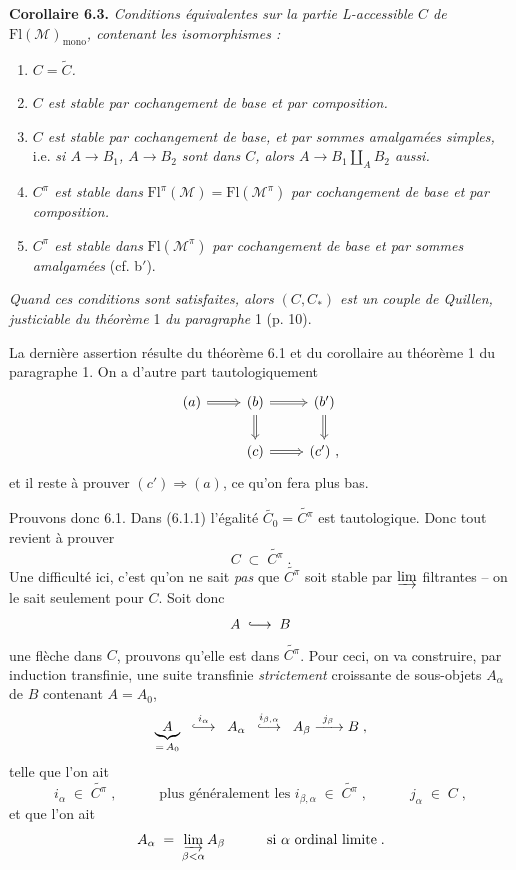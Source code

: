 \documentclass[11pt]{article}
\newcommand{\printedpage}[1]{\marginpar{\footnotesize p.~#1}}
\newcommand{\msp}[1]{\marginpar{\footnotesize [#1]}}
\newcommand{\Fl}{\mathrm{Fl}}
\newcommand{\into}{\lhook\joinrel\longrightarrow}
\begin{document}
\textbf{Corollaire 6.3.} \textit{Conditions équivalentes sur la partie L-accessible $C$ de} $\Fl(\mathcal{M})_{\mathrm{mono}}$\textit{, contenant les isomorphismes :}
\begin{enumerate}[label={}]
\item[a)] \textit{$C = \widetilde{C}$.}
\item[b)] \textit{$C$ est stable par cochangement de base et par composition.}
\item[b$'$)] \textit{$C$ est stable par cochangement de base, et par sommes amalgamées simples,} i.e. \textit{si $A \longrightarrow B_{1}$, $A \longrightarrow B_{2}$ sont dans $C$, alors $A \longrightarrow B_{1} \amalg_{A} B_{2}$ aussi.}
\item[c)] \textit{$C^{\pi}$ est stable dans} $\Fl^{\pi}(\mathcal{M}) = \Fl(\mathcal{M}^{\pi})$ \textit{par cochangement de base et par composition.}
\item[c$'$)] \textit{$C^{\pi}$ est stable dans} $\Fl(\mathcal{M}^{\pi})$ \textit{par cochangement de base et par sommes amalgamées} (cf. b$'$).
\end{enumerate}
\textit{Quand ces conditions sont satisfaites, alors $(C,C_{*})$ est un couple de Quillen, justiciable du théorème} 1 \textit{du paragraphe} 1 (p. 10).

La dernière assertion résulte du théorème 6.1 et du corollaire au théorème 1 du paragraphe 1. On a
\printedpage{43}%
\msp{page 78}
d'autre part tautologiquement
\[
\begin{tikzcd}
(a) \arrow[r, Rightarrow] & (b) \arrow[r, Rightarrow] \arrow[d, Rightarrow] & (b') \arrow[d, Rightarrow] \\
 & (c) \arrow[r, Rightarrow] & (c') \ ,
\end{tikzcd}
\]
et il reste à prouver $(c') \Longrightarrow (a)$, ce qu'on fera plus bas.

Prouvons donc 6.1. Dans (6.1.1) l'égalité $\widetilde{C_{0}} = \widetilde{C^{\pi}}$ est tautologique. Donc tout revient à prouver
\[
C \;\subset\; \widetilde{C^{\pi}} \; .
\]
Une difficulté ici, c'est qu'on ne sait \textit{pas} que $\widetilde{C^{\pi}}$ soit stable par $\varinjlim$ filtrantes -- on le sait seulement pour $C$. Soit donc
\[
A \;\into\; B
\]
une flèche dans $C$, prouvons qu'elle est dans $\widetilde{C^{\pi}}$. Pour ceci, on va construire, par induction transfinie, une suite transfinie \textit{strictement} croissante de sous-objets $A_{\alpha}$ de $B$ contenant $A = A_{0}$,
\[
\underbrace{A}_{=\,A_{0}} \;\; \overset{i_{\alpha}}{\into} \;\; A_{\alpha} \;\; \overset{i_{\beta,\alpha}}{\into} \;\; A_{\beta} \xrightarrow{\ j_{\beta}\ } B \; ,
\]
telle que l'on ait
\[
i_{\alpha} \;\in\; \widetilde{C^{\pi}} \; , \qquad\quad \text{plus généralement les } i_{\beta,\alpha} \;\in\; \widetilde{C^{\pi}} \; , \qquad\quad j_{\alpha} \;\in\; C \; ,
\]
et que l'on ait
\[
A_{\alpha} \;=\; \varinjlim_{\beta<\alpha} A_{\beta} \qquad\quad \text{si } \alpha \text{ ordinal limite} \; .
\]
\end{document}

